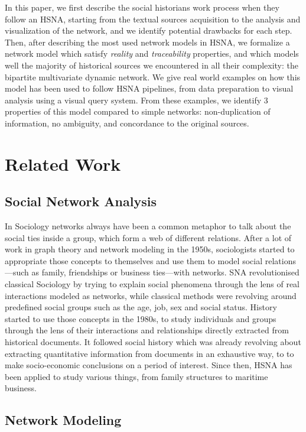 \documentclass{vgtc}                          %
\newcommand{\model}{bipartite multivariate dynamic network\xspace}
\begin{document}
In this paper, we first describe the social historians work process when they follow an HSNA, starting from the textual sources acquisition to the analysis and visualization of the network, and we identify potential drawbacks for each step.
Then, after describing the most used network models in HSNA, we formalize a network model which satisfy \textit{reality} and \textit{traceability} properties, and
which models well the majority of historical sources we encountered in all their complexity: the \model. We give real world examples on how this model has been used to follow HSNA pipelines, from data preparation to visual analysis using a visual query system. From these examples, we identify 3 properties of this model compared to simple networks: non-duplication of information, no ambiguity, and concordance to the original sources.

\section{Related Work}

\subsection{Social Network Analysis}

In Sociology networks always have been a common metaphor to talk about the social ties inside a group, which form a web of different relations. After a lot of work in graph theory and network modeling in the 1950s, sociologists started to appropriate those concepts to themselves and use them to model social relations---such as family, friendships or business ties---with networks. SNA revolutionised classical Sociology by trying to explain social phenomena through the lens of real interactions modeled as networks, while classical methods were revolving around predefined social groups such as the age, job, sex and social status. 
History started to use those concepts in the 1980s, to study individuals and groups through the lens of their interactions and relationships directly extracted from historical documents. It followed social history which was already revolving about extracting quantitative information from documents in an exhaustive way, to to make socio-economic conclusions on a period of interest. Since then, HSNA has been applied to study various things, from family structures to maritime business.

\subsection{Network Modeling}
\end{document}
